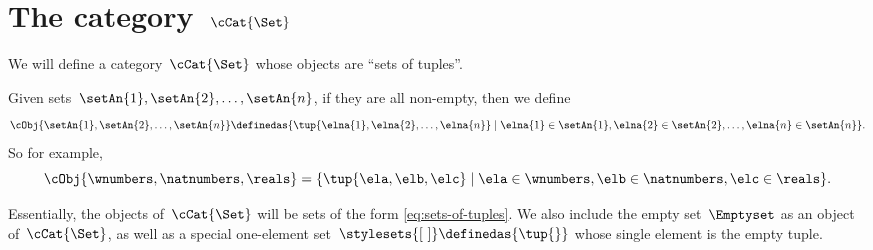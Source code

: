 
\section{The category~$\cCat{\Set}$}
\label{sec:cartcatset}

We will define a category~$\cCat{\Set}$ whose objects are ``sets of tuples''.

%
%
%

Given sets~$\setAn{1}, \setAn{2}, \dots , \setAn{n}$, if they are all non-empty, then we define
\begin{equation}
    \label{eq:sets-of-tuples}
    \cObj{\setAn{1}, \setAn{2}, \dots, \setAn{n}} \definedas \{ \tup{\elna{1}, \elna{2}, \dots, \elna{n}} \mid \elna{1} \in \setAn{1}, \elna{2} \in \setAn{2}, \dots, \elna{n} \in \setAn{n} \}.
\end{equation}
So for example,
\begin{equation*}
    \cObj{\wnumbers, \natnumbers, \reals} = \{ \tup{\ela, \elb, \elc} \mid \ela \in \wnumbers, \elb \in \natnumbers, \elc \in \reals \}.
\end{equation*}

Essentially, the objects of~$\cCat{\Set}$ will be sets of the form \cref{eq:sets-of-tuples}.
We also include the empty set~$\Emptyset$ as an object of~$\cCat{\Set}$, as well as a special one-element set~$\stylesets{[ \ ]} \definedas \{ \tup{} \}$ whose single element is the empty tuple.

